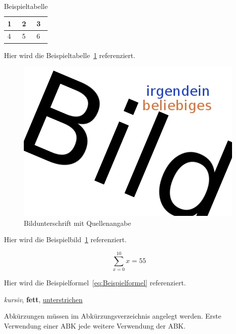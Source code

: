 \begin{table}[h]
	\centering
	\begin{tabular}{|l|l|l|}
		\hline
		1&2&3\\\hline
		4&5&6\\\hline
	\end{tabular}
	\caption{Beispieltabelle}
	\label{Tab:Beispieltabelle}
\end{table}

Hier wird die Beispieltabelle~\ref{Tab:Beispieltabelle} referenziert.

\begin{figure}[h] %
	\centering
	\includegraphics[scale=.25]{abbildungen/bild1}
	\caption[Bildunterschrift mit Quellenangabe]{Bildunterschrift mit Quellenangabe \cite{lcd}}
	\label{Fig:Bildbezeichnung}
\end{figure}

Hier wird die Beispielbild~\ref{Fig:Bildbezeichnung} referenziert.

\begin{equation} \label{eq:Beispielformel}
	\sum_{x=0}^{10}x=55
\end{equation}

Hier wird die Beispielformel~\ref{eq:Beispielformel} referenziert.

\textit{kursiv}, \textbf{fett}, \underline{unterstrichen}

Abkürzungen müssen im Abkürzungsverzeichnis angelegt werden.
Erste Verwendung einer \ac{ABK} jede weitere Verwendung der \ac{ABK}.

\nocite{*}

